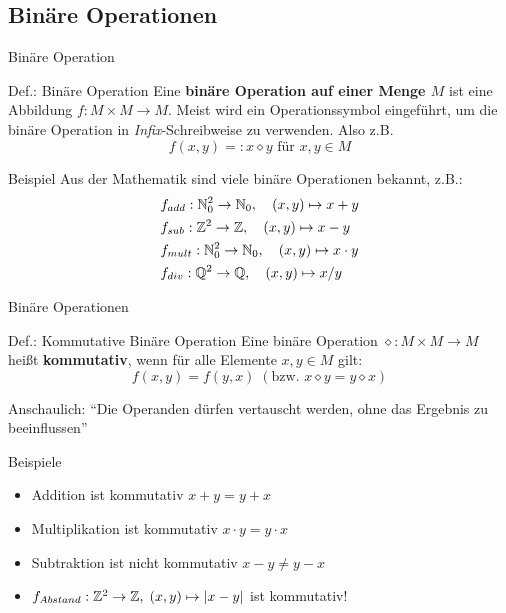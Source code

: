 \subsection{Binäre Operationen}

\begin{frame}{Binäre Operation}
	\begin{block}{Def.: Binäre Operation}
		Eine \textbf{binäre Operation auf einer Menge $M$} ist eine Abbildung $f: M \times M \to M$. Meist wird ein Operationssymbol eingeführt, um die binäre Operation in \textit{Infix}-Schreibweise zu verwenden. Also z.B.
		\medskip
		\[f(x,y) =: x \diamond y \text{ für } x,y \in M\]
	\end{block}

	\begin{exampleblock}{Beispiel}
		Aus der Mathematik sind viele binäre Operationen bekannt, z.B.: \begin{align*}
			&f_{add}: \mathbb{N}_0^2 \to \mathbb{N}_0, \quad (x,y) \mapsto x+y \\
			&f_{sub}: \mathbb{Z}^2 \to \mathbb{Z}, \quad (x,y) \mapsto x-y \\
			&f_{mult}: \mathbb{N}_0^2 \to \mathbb{N}_0, \quad (x,y) \mapsto x \cdot y \\
			&f_{div}: \mathbb{Q}^2 \to \mathbb{Q}, \quad (x,y) \mapsto x / y \\
		\end{align*}
	\end{exampleblock}
	
\end{frame}

\begin{frame}{Binäre Operationen}
	\begin{block}{Def.: Kommutative Binäre Operation}
		Eine binäre Operation $\diamond:M \times M \to M$  heißt \textbf{kommutativ}, wenn für alle Elemente $x,y \in M$ gilt: 
		\medskip
		\[f(x,y) = f(y,x) \; (\text{bzw. } x \diamond y = y \diamond x)\]
		
		\medskip
		Anschaulich: \enquote{Die Operanden dürfen vertauscht werden, ohne das Ergebnis zu beeinflussen}
	\end{block}

	\begin{exampleblock}{Beispiele}
		\begin{itemize}
			\item Addition ist kommutativ $x + y = y + x$
			\item Multiplikation ist kommutativ $x \cdot y = y \cdot x$
			\item Subtraktion ist nicht kommutativ $ x-y \ne y-x$
			\item $f_{Abstand}: \mathbb{Z}^2 \to \mathbb{Z}, \; (x,y) \mapsto |x-y|$ ist kommutativ!
		\end{itemize}
	\end{exampleblock}
\end{frame}

